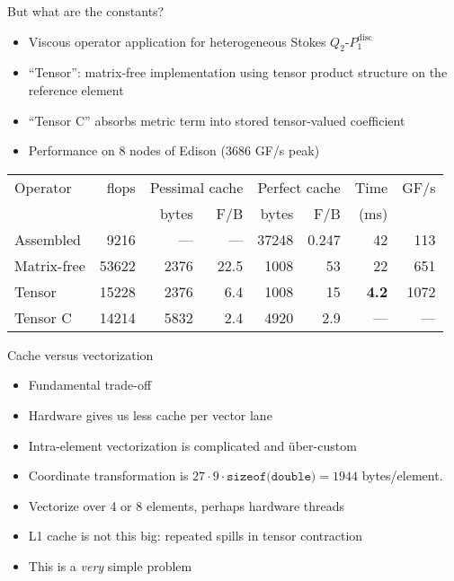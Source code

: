 \documentclass{beamer}
\begin{document}
\begin{frame}{But what are the constants?}
  \begin{itemize}
  \item Viscous operator application for heterogeneous Stokes $Q_2$-$P_1^{\text{disc}}$
  \item ``Tensor'': matrix-free implementation using tensor product structure on the reference element
  \item ``Tensor C'' absorbs metric term into stored tensor-valued coefficient
  \item Performance on 8 nodes of Edison (3686 GF/s peak)
  \end{itemize}
  \begin{tabular}{lrrrrrrr}
    \toprule
    Operator & flops & \multicolumn{2}{c}{Pessimal cache} & \multicolumn{2}{c}{Perfect cache} & Time & GF/s \\
    & & bytes & F/B & bytes & F/B & (ms) & \\
    \midrule
    Assembled & 9216 & --- & --- &  37248 & 0.247 & 42 & 113 \\
    Matrix-free & 53622 & 2376 & 22.5 & 1008 & 53 & 22 & 651 \\
    Tensor & 15228 & 2376 & 6.4 & 1008 & 15 & {\bf 4.2} & 1072 \\
    Tensor C & 14214 & 5832 & 2.4 & 4920 & 2.9 & --- & --- \\
    \bottomrule
  \end{tabular}
\end{frame}

\begin{frame}{Cache versus vectorization}
  \begin{itemize}
  \item Fundamental trade-off
  \item Hardware gives us less cache per vector lane
  \item Intra-element vectorization is complicated and \"uber-custom
  \item Coordinate transformation is $27\cdot 9\cdot \texttt{sizeof(double)} = 1944$ bytes/element.
  \item Vectorize over 4 or 8 elements, perhaps hardware threads
  \item L1 cache is not this big: repeated spills in tensor contraction
  \item This is a \emph{very} simple problem
  \end{itemize}
\end{frame}
\end{document}
